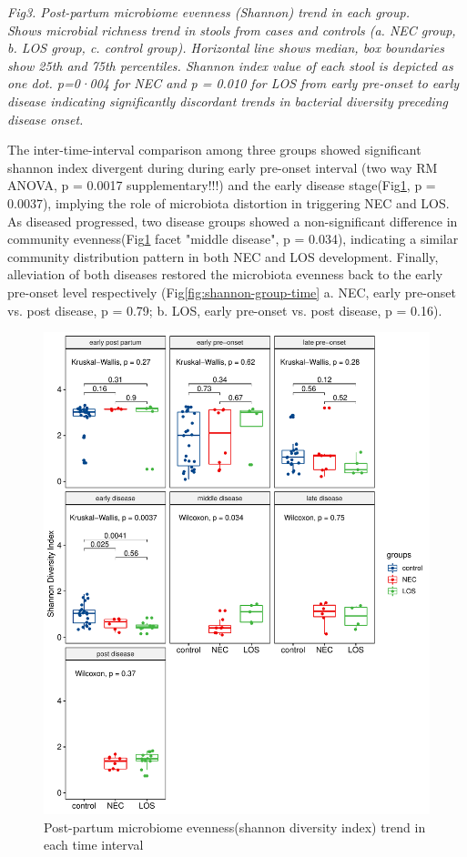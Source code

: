 \documentclass[fleqn,10pt]{wlpeerj} %
\begin{document}
    \textit{Fig3. Post-partum microbiome evenness (Shannon) trend in each group. \\ Shows microbial richness trend in stools from cases and controls (a. NEC group, b. LOS group, c. control group). Horizontal line shows median, box boundaries show 25th and 75th percentiles.  Shannon index value of each stool is depicted as one dot. p=0·004 for NEC and p = 0.010 for LOS from early pre-onset to early disease indicating significantly discordant trends in bacterial diversity preceding disease onset. }


    \noindent
    The inter-time-interval comparison among three groups showed significant shannon index divergent during during early pre-onset interval (two way RM ANOVA, p = 0.0017 supplementary!!!) and the early disease stage(Fig\ref{fig:shannon-time-groups}, p = 0.0037), implying the role of microbiota distortion in triggering NEC and LOS. As diseased progressed, two disease groups showed a non-significant difference in community evenness(Fig\ref{fig:shannon-time-groups} facet "middle disease", p = 0.034), indicating a similar community distribution pattern in both NEC and LOS development. Finally, alleviation of both diseases restored the microbiota evenness back to the early pre-onset level respectively (Fig\ref{fig:shannon-group-time} a. NEC, early pre-onset vs. post disease, p = 0.79; b. LOS, early pre-onset vs. post disease, p = 0.16).
    \begin{figure}[ht]\centering
      \includegraphics[width=\linewidth]{figure/shannon-time-groups.pdf}
      \caption{Post-partum microbiome evenness(shannon diversity index) trend in each time interval}
      \label{fig:shannon-time-groups}
    \end{figure}
\end{document}
